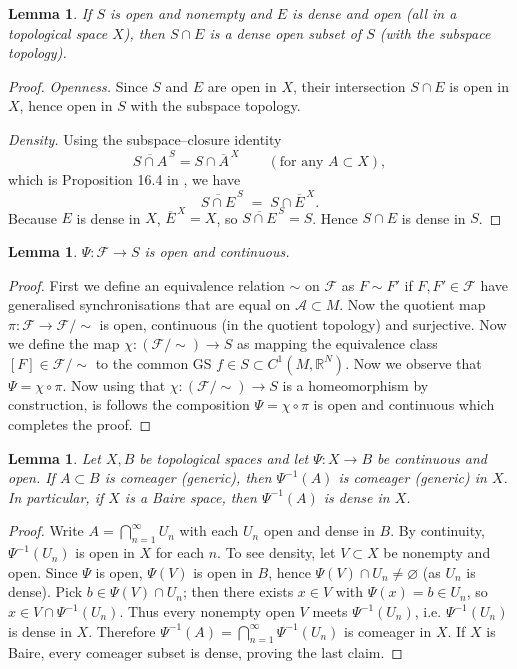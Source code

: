 \documentclass{article}
\newtheorem{lemma}[theorem]{Lemma}
\theoremstyle{definition}
\theoremstyle{definition}
\numberwithin{theorem}{section}
\begin{document}
\begin{lemma}
\label{lem::topology}
    If $S$ is open and nonempty and $E$ is dense and open (all in a topological space $X$), then
    $S \cap E$ is a dense open subset of $S$ (with the subspace topology).
\end{lemma}

\begin{proof}
\emph{Openness.} Since $S$ and $E$ are open in $X$, their intersection $S\cap E$ is open in $X$, hence open in $S$ with the subspace topology.

\emph{Density.} Using the subspace–closure identity
\[
\overline{S \cap A}^{\,S}= S \cap \overline{A}^{\,X} \qquad(\text{for any }A\subset X),
\]
which is Proposition 16.4 in \cite{Munkres2000Topology}, we have
\[
\overline{S\cap E}^{\,S} \;=\; S \cap \overline{E}^{\,X}.
\]
Because $E$ is dense in $X$, $\overline{E}^{\,X}=X$, so $\overline{S\cap E}^{\,S}=S$. Hence $S\cap E$ is dense in $S$.
\end{proof}

\begin{lemma}
    \label{lem::open_and_cont}
    $\Psi : \mathcal{F} \to S$ is open and continuous.
\end{lemma}

\begin{proof}
    First we define an equivalence relation $\sim$ on $\mathcal{F}$ as $F \sim F'$ if $F, F' \in \mathcal{F}$ have generalised synchronisations that are equal on $\mathcal{A} \subset M$.
    Now the quotient map $\pi : \mathcal{F} \to \mathcal{F} / \sim$ is open, continuous (in the quotient topology) and surjective. Now we define the map $\chi : (\mathcal{F} / \sim) \to S$ as mapping the equivalence class $[F] \in \mathcal{F} / \sim$ to the common GS $f \in S \subset C^1(M,\mathbb{R}^N)$. Now we observe that $\Psi = \chi \circ \pi$. Now using that $\chi : (\mathcal{F} / \sim) \to S$ is a homeomorphism by construction, is follows the composition $\Psi = \chi \circ \pi$ is open and continuous which completes the proof.
\end{proof}

\begin{lemma}
\label{lem::topology2}
Let $X,B$ be topological spaces and let $\Psi:X\to B$ be continuous and open.
If $A\subset B$ is comeager (generic), then $\Psi^{-1}(A)$ is comeager (generic) in $X$.
In particular, if $X$ is a Baire space, then $\Psi^{-1}(A)$ is dense in $X$.
\end{lemma}

\begin{proof}
Write $A=\bigcap_{n=1}^\infty U_n$ with each $U_n$ open and dense in $B$.
By continuity, $\Psi^{-1}(U_n)$ is open in $X$ for each $n$.
To see density, let $V\subset X$ be nonempty and open.
Since $\Psi$ is open, $\Psi(V)$ is open in $B$, hence $\Psi(V)\cap U_n\neq\varnothing$ (as $U_n$ is dense).
Pick $b\in \Psi(V)\cap U_n$; then there exists $x\in V$ with $\Psi(x)=b\in U_n$, so $x\in V\cap \Psi^{-1}(U_n)$.
Thus every nonempty open $V$ meets $\Psi^{-1}(U_n)$, i.e. $\Psi^{-1}(U_n)$ is dense in $X$.
Therefore $\Psi^{-1}(A)=\bigcap_{n=1}^\infty \Psi^{-1}(U_n)$ is comeager in $X$.
If $X$ is Baire, every comeager subset is dense, proving the last claim.
\end{proof}



\end{document}
